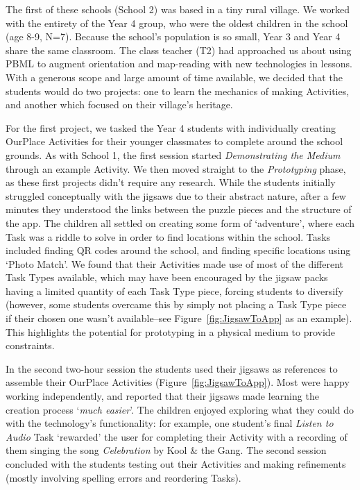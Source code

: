 The first of these schools (School 2) was based in a tiny rural village. We worked with the entirety of the Year 4 group, who were the oldest children in the school (age 8-9, N=7). Because the school's population is so small, Year 3 and Year 4 share the same classroom. The class teacher (T2) had approached us about using PBML to augment orientation and map-reading with new technologies in lessons. With a generous scope and large amount of time available, we decided that the students would do two projects: one to learn the mechanics of making Activities, and another which focused on their village's heritage. 

For the first project, we tasked the Year 4 students with individually creating OurPlace Activities for their younger classmates to complete around the school grounds. As with School 1, the first session started \textit{Demonstrating the Medium} through an example Activity. We then moved straight to the \textit{Prototyping} phase, as these first projects didn't require any research. While the students initially struggled conceptually with the jigsaws due to their abstract nature, after a few minutes they understood the links between the puzzle pieces and the structure of the app. The children all settled on creating some form of `adventure', where each Task was a riddle to solve in order to find locations within the school. Tasks included finding QR codes around the school, and finding specific locations using `Photo Match'. We found that their Activities made use of most of the different Task Types available, which may have been encouraged by the jigsaw packs having a limited quantity of each Task Type piece, forcing students to diversify (however, some students overcame this by simply not placing a Task Type piece if their chosen one wasn't available--see Figure~\ref{fig:JigsawToApp} as an example). This highlights the potential for prototyping in a physical medium to provide constraints.

In the second two-hour session the students used their jigsaws as references to assemble their OurPlace Activities (Figure~\ref{fig:JigsawToApp}). Most were happy working independently, and reported that their jigsaws made learning the creation process `\textit{much easier}'. The children enjoyed exploring what they could do with the technology's functionality: for example, one student's final \textit{Listen to Audio} Task `rewarded' the user for completing their Activity with a recording of them singing the song \textit{Celebration} by Kool \& the Gang. The second session concluded with the students testing out their Activities and making refinements (mostly involving spelling errors and reordering Tasks). 

